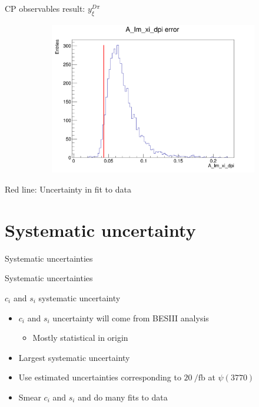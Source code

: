 \documentclass{beamer}
\begin{document}
\begin{frame}{CP observables result: $y_\xi^{D\pi}$}
\begin{figure}
\begin{subfigure}{0.42\textwidth}
      \includegraphics[width = 1.0\textwidth]{Plots/A_Im_xi_dpi_error_WithDataUncertainty.png}
    \end{subfigure}
  \end{figure}
  \begin{center}
    Red line: Uncertainty in fit to data
  \end{center}
\end{frame}

\section{Systematic uncertainty}
\begin{frame}{Systematic uncertainties}
  \begin{center}
    {\huge Systematic uncertainties}
  \end{center}
\end{frame}

\begin{frame}{$c_i$ and $s_i$ systematic uncertainty}
  \begin{itemize}
    \setlength\itemsep{1.5em}
    \item{$c_i$ and $s_i$ uncertainty will come from BESIII analysis}
    \begin{itemize}
      \item{Mostly statistical in origin}
    \end{itemize}
    \item{Largest systematic uncertainty}
    \item{Use estimated uncertainties corresponding to $\SI{20}{\per\femto\barn}$ at $\psi(3770)$}
    \item{Smear $c_i$ and $s_i$ and do many fits to data}
  \end{itemize}
\end{frame}
\end{document}
